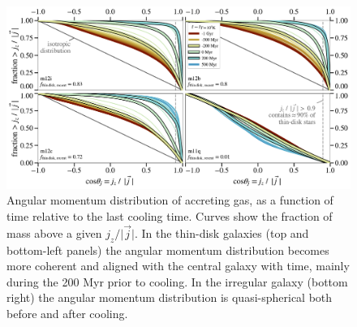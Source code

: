 \documentclass[fleqn,usenatbib]{mnras}
\begin{document}
\label{s: mechanics}

\begin{figure}
    \centering
    \includegraphics[width=\textwidth]{figures/jzjmag_vs_t.pdf}
    \caption{
    Angular momentum distribution of accreting gas, as a function of time relative to the last cooling time. Curves show the fraction of mass above a given $j_z / \vert \vec j \vert$. 
    In the thin-disk galaxies (top and bottom-left panels) the angular momentum distribution becomes more coherent and aligned with the central galaxy with time, mainly during the 200 Myr prior to cooling. In the irregular galaxy (bottom right) the angular momentum distribution is quasi-spherical both before and after cooling. 
    }
    \label{f: coherence}
\end{figure}
\end{document}
